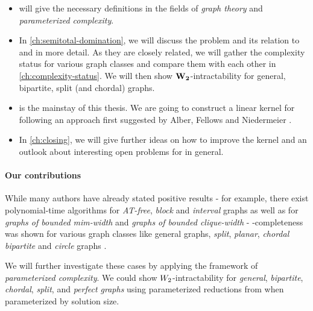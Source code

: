 \begin{itemize}
    \item {} will give the necessary definitions in the fields of \textit{graph theory} and \textit{parameterized complexity}.
    \item In \cref{ch:semitotal-domination}, we will discuss the \sdom problem and its relation to \dom and \tdom in more detail. 
    As they are closely related, we will gather the complexity status for various graph classes and compare them with each other in \cref{ch:complexity-status}. 
    We will then show $\mathbf{W_2}$-intractability for general, bipartite, split (and chordal) graphs.
    \item {} is the mainstay of this thesis. 
    We are going to construct a linear kernel for \psdom following an approach first suggested by Alber, Fellows and Niedermeier \cite{Alber2004}. 
    \item In \cref{ch:closing}, we will give further ideas on how to improve the kernel and an outlook about interesting open problems for \sdom in general.
\end{itemize}

\paragraph{Our contributions}

While many authors have already stated positive results - for example, there exist polynomial-time algorithms for \emph{AT-free}, \emph{block} and \emph{interval} graphs as well as for \emph{graphs of bounded mim-width} and \emph{graphs of bounded clique-width} \cite{Kloks2021, Galby2020,Courcelle1990,Henning2022,Henning2019} - \NP-completeness was shown for various graph classes like general graphs, \emph{split}, \emph{planar}, \emph{chordal bipartite} and \emph{circle} graphs \cite{Henning2019, Kloks2021}.


We will further investigate these \NPc cases by applying the framework of \textit{parameterized complexity}. 
We could show $W_2$-intractability for \textit{general}, \textit{bipartite}, \textit{chordal}, \textit{split}, and \textit{perfect graphs} using parameterized reductions from \dom when parameterized by solution size.

